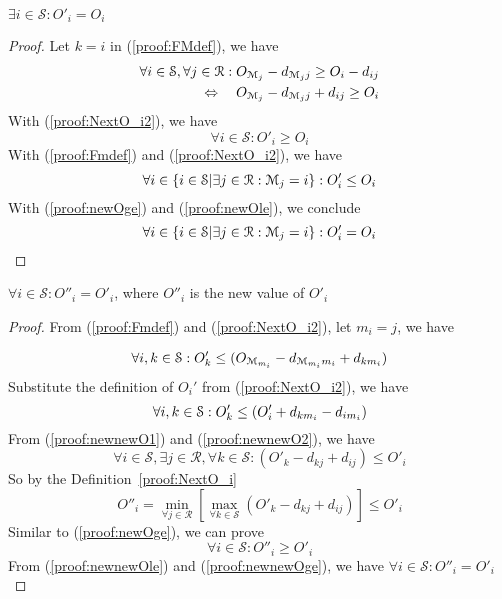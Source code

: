 \begin{theorem}\label{thm:someO_unchanged}
	$\exists i \in \mathcal{S}:O'_i=O_i$
\end{theorem}
\begin{proof}
Let $k=i$ in (\ref{proof:FMdef}), we have
\begin{equation*}\begin{split}
\forall i \in \mathcal{S}, \forall j \in \mathcal{R} : {O_{{\mathcal{M}_{j}}}-d_{{{\mathcal{M}_{j}}}{j}}} \ge O_i - d_{ij}\\
\Leftrightarrow\hspace{1em} {O_{{\mathcal{M}_{j}}}-d_{{{\mathcal{M}_{j}}}{j}}}+ d_{{i}{j}} \ge O_i
\end{split}\end{equation*}
With (\ref{proof:NextO_i2}), we have
\begin{equation} \label{proof:newOge}
\forall i \in \mathcal{S}: O'_i \ge O_i
\end{equation}
With (\ref{proof:Fmdef}) and (\ref{proof:NextO_i2}), we have
\begin{equation} \label{proof:newOle}
\forall i \in \{i \in \mathcal{S}| \exists j \in \mathcal{R}:{\mathcal{M}_{j}}=i\}:O'_i \le O_i
\end{equation}
With (\ref{proof:newOge}) and (\ref{proof:newOle}), we conclude
\begin{equation}\label{proof:O_i_unchanged}
\forall i \in \{i \in \mathcal{S}| \exists j \in \mathcal{R}:{\mathcal{M}_{j}}=i\}:O'_i = O_i
\end{equation}
\end{proof}
\begin{theorem}\label{thm:allnewO_unchanged}
	$\forall i \in \mathcal{S}: O''_i = O'_i$, where $O''_i$ is the new value of $O'_i$
\end{theorem}
\begin{proof}
From (\ref{proof:Fmdef}) and (\ref{proof:NextO_i2}), let $m_i = j$, we have

\begin{equation}\label{proof:newnewO1}
	\forall i,k \in \mathcal{S}: O'_k\le({O_{{\mathcal{M}_{{m_{i}}}}}-d_{{{\mathcal{M}_{{m_{i}}}}}{{m_{i}}}}}+ d_{{k}{{m_{i}}}})
\end{equation}
Substitute the definition of $O_i'$ from (\ref{proof:NextO_i2}), we have
\begin{equation}\label{proof:newnewO2}
	\forall i,k \in \mathcal{S}: O'_k\le (O'_i + d_{k{m_{i}}} - d_{i{m_{i}}})
\end{equation}
From (\ref{proof:newnewO1}) and (\ref{proof:newnewO2}), we have
\begin{equation*}
	\forall i \in \mathcal{S}, \exists j \in \mathcal{R}, \forall k \in \mathcal{S}: (O'_k-d_{kj}+d_{ij}) \le O'_i
\end{equation*}
So by the Definition~\ref{proof:NextO_i}
\begin{equation} \label{proof:newnewOle}
O''_i = \min_{\forall  j \in \mathcal{R}}\left[\max_{\forall k \in \mathcal{S}}\left(O'_k - d_{kj} + d_{ij}\right)\right]\le O'_i
\end{equation}
Similar to (\ref{proof:newOge}), we can prove
\begin{equation}\label{proof:newnewOge}
	\forall i \in \mathcal{S}:O''_i \ge O'_i
\end{equation}
From (\ref{proof:newnewOle}) and (\ref{proof:newnewOge}), we have $\forall i \in \mathcal{S}: O''_i=O'_i$
\end{proof}
